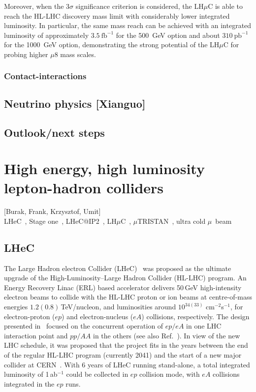 \documentclass[a4paper,11pt]{article}
\newcommand{\lhuc}{LH\ensuremath{\mu}C\xspace}
\begin{document}
Moreover, when the $3\sigma$ significance criterion is considered, the LH$\mu$C is able to reach the HL-LHC discovery mass limit with considerably lower integrated luminosity. In particular, the same mass reach can be achieved with an integrated luminosity of approximately $3.5~\mathrm{fb}^{-1}$ for the 500~GeV option and about $310~\mathrm{pb}^{-1}$ for the 1000~GeV option, demonstrating the strong potential of the LH$\mu$C for probing higher $\mu8$ mass scales.


\subsubsection{Contact-interactions}


\subsection{Neutrino physics [Xianguo]}


\subsection{Outlook/next steps}


\newpage




\section{High energy, high luminosity lepton-hadron colliders}

[Burak, Frank, Krzysztof, Umit]\\

LHeC~\cite{LHeC:2020van}, Stage one~\cite{Andre:2025iar}, LHeC@IP2~\cite{Andre:2022xeh}, \lhuc~\cite{Akturk:2025ubm}, $\mu$TRISTAN~\cite{Hamada:2022mua}, ultra cold $\mu$~beam~\cite{Aritome:2024rlu}

\label{sec:LHcolliders}

\subsection{LHeC}
The Large Hadron electron Collider (LHeC)~\cite{LHeCStudyGroup:2012zhm,LHeC:2020van} was proposed as the ultimate upgrade of the High-Luminosity--Large Hadron Collider (HL-LHC) program. An Energy Recovery Linac (ERL) based accelerator delivers 50\,GeV high-intensity electron beams to collide with the HL-LHC proton or ion beams at centre-of-mass energies $1.2 (0.8)$\,TeV/nucleon, and luminosities around $10^{34(33)}$ cm$^{-2}$s$^{-1}$, for electron-proton ($ep$) and electron-nucleus ($eA$) collisions, respectively. The design presented in~\cite{LHeCStudyGroup:2012zhm,LHeC:2020van} focused on the concurrent operation of $ep/eA$ in one LHC interaction point and $pp/AA$ in the others (see also Ref.~\cite{Andre:2022xeh}). In view of the new LHC schedule, it was proposed that the project fits in the years between the end of the regular HL-LHC program (currently 2041) and the start of a new major collider at CERN~\cite{Ahmadova:2025vzd}. With 6 years of LHeC running stand-alone, a total integrated luminosity of 1\,ab$^{-1}$ could be collected in $ep$ collision mode, with $eA$ collisions integrated in the $ep$ runs. 
\end{document}
